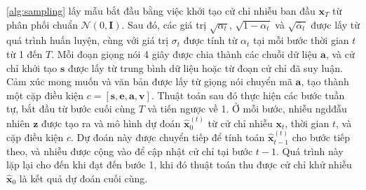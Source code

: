 \autoref{alg:sampling} lấy mẫu bắt đầu bằng việc khởi tạo cử chỉ nhiễu ban đầu $\mathbf{x}_T$ từ phân phối chuẩn $\mathcal{N}(0, \mathbf{I})$. Sau đó, các giá trị $\sqrt{\alpha_t}$, $\sqrt{1 - \alpha_t}$ và $\sqrt{\bar{\alpha}_t}$ được lấy từ quá trình huấn luyện, cùng với giá trị $\sigma_t$ được tính từ $\alpha_t$ tại mỗi bước thời gian $t$ từ 1 đến $T$. Mỗi đoạn giọng nói 4 giây được chia thành các chuỗi dữ liệu $\mathbf{a}$, và cử chỉ khởi tạo $\mathbf{s}$ được lấy từ trung bình dữ liệu hoặc từ đoạn cử chỉ đã suy luận. Cảm xúc mong muốn và văn bản được lấy từ giọng nói chuyển mã $\mathbf{a}$, tạo thành một cặp điều kiện $c = [\mathbf{s}, \mathbf{e}, \mathbf{a}, \mathbf{v}]$. Thuật toán sau đó thực hiện các bước tuần tự, bắt đầu từ bước cuối cùng $T$ và tiến ngược về 1. Ở mỗi bước, nhiễu ngdđẫu nhiên $\mathbf{z}$ được tạo ra và mô hình dự đoán $\hat{\mathbf{x}}_0^{(t)}$ từ cử chỉ nhiễu $\mathbf{x}_t$, thời gian $t$, và cặp điều kiện $c$. Dự đoán này được chuyển tiếp để tính toán $\hat{\mathbf{x}}_{t-1}^{(t)}$ cho bước tiếp theo, và nhiễu được cộng vào để cập nhật cử chỉ tại bước $t-1$. Quá trình này lặp lại cho đến khi đạt đến bước 1, khi đó thuật toán thu được cử chỉ khử nhiễu $\hat{\mathbf{x}}_0$ là kết quả dự đoán cuối cùng.







